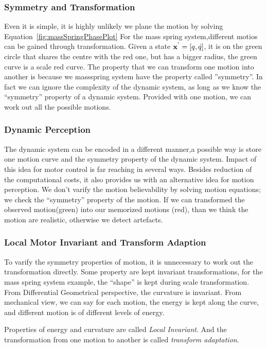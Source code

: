 \subsubsection*{Symmetry and Transformation}
Even it is simple, it is highly unlikely we plane the motion by solving Equation~\ref{fig:massSpringPhasePlot}
For the mass spring system,different motios can be gained through transformation.
Given a state $\mathbf{x}^{'}=[q,\dot{q}]$, it is on the green circle that shares the centre with the red one, but has a bigger radius, the green curve is a scale red curve.
The property that we can transform one motion into another is because we massspring system have the property called ''symmetry''.
In fact we can ignore the complexity of the dynamic system, as long as we know the ``symmetry'' property of a dynamic system. 
Provided with one motion, we can work out all the possible motions.

\subsubsection*{Dynamic Perception}

The dynamic system can be encoded in a different manner,a possible way is store one motion curve and the symmetry property of the dynamic system.
Impact of this idea for motor control is far reaching in several ways. 
Besides reduction of the computational costs, it also provides us with an alternative idea for motion perception. 
We don't varify the motion believability by solving motion equations; we check the ``symmetry'' property of the motion.
If we can transformed the observed motion(green) into our memorized motions (red), than we think the motion are realistic, otherwise we detect artefacts.


\subsubsection*{Local Motor Invariant and Transform Adaption}
To varify the symmetry properties of motion, it is unnecessary to work out the transformation directly. 
Some property are kept invariant transformations, for the mass spring system example, the ``shape'' is kept during scale transformation. 
From Differential Geometrical perspective,  the curvature is invariant. 
From mechanical view, we can say for each motion, the energy is kept along the curve, and different motion is of different levels of energy. 

Properties of energy and curvature are called \emph{Local Invariant}. 
And the transformation from one motion to another is called \emph{transform adaptation}.

